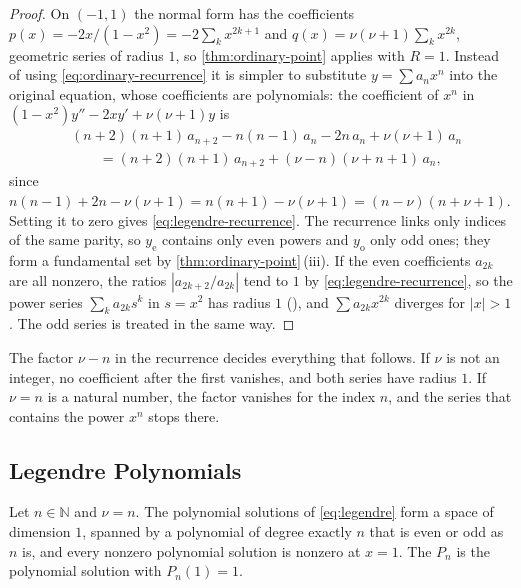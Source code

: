 \begin{proof}
On $(-1,1)$ the normal form has the coefficients $p(x)=-2x/(1-x^2)=-2\sum_kx^{2k+1}$ and $q(x)=\nu(\nu+1)\sum_kx^{2k}$, geometric series of radius $1$, so \cref{thm:ordinary-point} applies with $R=1$. Instead of using \eqref{eq:ordinary-recurrence} it is simpler to substitute $y=\sum a_nx^n$ into the original equation, whose coefficients are polynomials: the coefficient of $x^n$ in $(1-x^2)y''-2xy'+\nu(\nu+1)y$ is
\begin{align*}
&(n+2)(n+1)\,a_{n+2}-n(n-1)\,a_n-2n\,a_n+\nu(\nu+1)\,a_n\\
&\qquad=(n+2)(n+1)\,a_{n+2}+(\nu-n)(\nu+n+1)\,a_n ,
\end{align*}
since $n(n-1)+2n-\nu(\nu+1)=n(n+1)-\nu(\nu+1)=(n-\nu)(n+\nu+1)$. Setting it to zero gives \eqref{eq:legendre-recurrence}. The recurrence links only indices of the same parity, so $y_{\mathrm e}$ contains only even powers and $y_{\mathrm o}$ only odd ones; they form a fundamental set by \cref{thm:ordinary-point}\,(iii). If the even coefficients $a_{2k}$ are all nonzero, the ratios $|a_{2k+2}/a_{2k}|$ tend to $1$ by \eqref{eq:legendre-recurrence}, so the power series $\sum_ka_{2k}s^k$ in $s=x^2$ has radius $1$ (), and $\sum a_{2k}x^{2k}$ diverges for $|x|>1$. The odd series is treated in the same way.
\end{proof}

The factor $\nu-n$ in the recurrence decides everything that follows. If $\nu$ is not an integer, no coefficient after the first vanishes, and both series have radius $1$. If $\nu=n$ is a natural number, the factor vanishes for the index $n$, and the series that contains the power $x^n$ stops there.

\subsection{Legendre Polynomials}

\begin{theorem}
\label{thm:legendre-polynomials}
Let $n\in\mathbb N$ and $\nu=n$. The polynomial solutions of \eqref{eq:legendre} form a space of dimension $1$, spanned by a polynomial of degree exactly $n$ that is even or odd as $n$ is, and every nonzero polynomial solution is nonzero at $x=1$. The  $P_n$ is the polynomial solution with $P_n(1)=1$.
\end{theorem}

